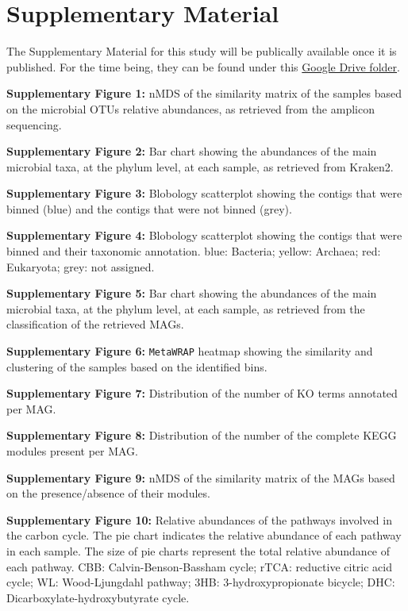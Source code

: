 \section*{Supplementary Material}
\label{swamp:suppl}   

   The Supplementary Material for this study will be publically available once it is published. 
   For the time being, they can be found under this \href{https://drive.google.com/drive/folders/1eQiXxsUPJ4QuIFxa1g5dWFw0CySuYvKD?usp=sharing}{Google Drive folder}.

   \textbf{Supplementary Figure 1:} nMDS of the similarity matrix of the samples based on the microbial OTUs relative abundances, as retrieved from the amplicon sequencing. 

   \textbf{Supplementary Figure 2:} Bar chart showing the abundances of the main microbial taxa, at the phylum level, at each sample, as retrieved from Kraken2. 

   \textbf{Supplementary Figure 3:} Blobology scatterplot showing the contigs that were binned (blue) and the contigs that were not binned (grey). 

   \textbf{Supplementary Figure 4:} Blobology scatterplot showing the contigs that were binned and their taxonomic annotation. blue: Bacteria; yellow: Archaea; red: Eukaryota; grey: not assigned. 

   \textbf{Supplementary Figure 5:} Bar chart showing the abundances of the main microbial taxa, at the phylum level, at each sample, as retrieved from the classification of the retrieved MAGs.

   \textbf{Supplementary Figure 6:} \texttt{MetaWRAP} heatmap showing the similarity and clustering of the samples based on the identified bins.  

   \textbf{Supplementary Figure 7:} Distribution of the number of KO terms annotated per MAG. 

   \textbf{Supplementary Figure 8:} Distribution of the number of the complete KEGG modules present per MAG. 

   \textbf{Supplementary Figure 9:} nMDS of the similarity matrix of the MAGs based on the presence/absence of their modules. 

   \textbf{Supplementary Figure 10:} Relative abundances of the pathways involved in the carbon cycle. The pie chart indicates the relative abundance of each pathway in each sample. The size of pie charts represent the total relative abundance of each pathway. 
                                    CBB: Calvin-Benson-Bassham cycle; rTCA: reductive citric acid cycle; WL: Wood-Ljungdahl pathway; 3HB: 3-hydroxypropionate bicycle; DHC: Dicarboxylate-hydroxybutyrate cycle.


